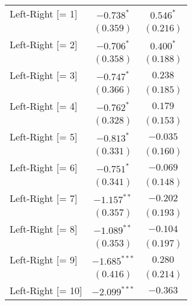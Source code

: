 \begin{center}
\begin{tiny}
\begin{longtable}{l@{} c@{} c@{}}
\quad Left-Right [= 1]                                   & $-0.738^{*}$     & $0.546^{*}$      \\
                                                         & $(0.359)$        & $(0.216)$        \\
\quad Left-Right [= 2]                                   & $-0.706^{*}$     & $0.400^{*}$      \\
                                                         & $(0.358)$        & $(0.188)$        \\
\quad Left-Right [= 3]                                   & $-0.747^{*}$     & $0.238$          \\
                                                         & $(0.366)$        & $(0.185)$        \\
\quad Left-Right [= 4]                                   & $-0.762^{*}$     & $0.179$          \\
                                                         & $(0.328)$        & $(0.153)$        \\
\quad Left-Right [= 5]                                   & $-0.813^{*}$     & $-0.035$         \\
                                                         & $(0.331)$        & $(0.160)$        \\
\quad Left-Right [= 6]                                   & $-0.751^{*}$     & $-0.069$         \\
                                                         & $(0.341)$        & $(0.148)$        \\
\quad Left-Right [= 7]                                   & $-1.157^{**}$    & $-0.202$         \\
                                                         & $(0.357)$        & $(0.193)$        \\
\quad Left-Right [= 8]                                   & $-1.089^{**}$    & $-0.104$         \\
                                                         & $(0.353)$        & $(0.197)$        \\
\quad Left-Right [= 9]                                   & $-1.685^{***}$   & $0.280$          \\
                                                         & $(0.416)$        & $(0.214)$        \\
\quad Left-Right [= 10]                                  & $-2.099^{***}$   & $-0.363$         \\

\end{longtable}
\end{tiny}
\end{center}
